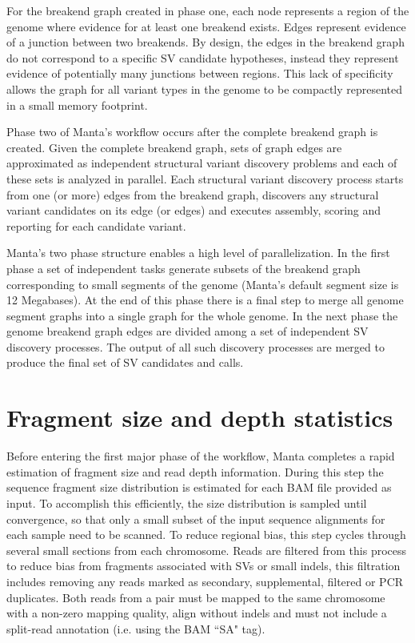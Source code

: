 \documentclass{article}
\begin{document}
For the breakend graph created in phase one, each node represents a region of the genome where evidence for at least one breakend exists. Edges represent evidence of a junction between two breakends. By design, the edges in the breakend graph do not correspond to a specific SV candidate hypotheses, instead they represent evidence of potentially many junctions between regions. This lack of specificity allows the graph for all variant types in the genome to be compactly represented in a small memory footprint.

Phase two of Manta's workflow occurs after the complete breakend graph is created. Given the complete breakend graph, sets of graph edges are approximated as independent structural variant discovery problems and each of these sets is analyzed in parallel. Each structural variant discovery process starts from one (or more) edges from the breakend graph, discovers any structural variant candidates on its edge (or edges) and executes assembly, scoring and reporting for each candidate variant.

Manta's two phase structure enables a high level of parallelization. In the first phase a set of independent tasks generate subsets of the breakend graph corresponding to small segments of the genome (Manta's default segment size is 12 Megabases). At the end of this phase there is a final step to merge all genome segment graphs into a single graph for the whole genome. In the next phase the genome breakend graph edges are divided among a set of independent SV discovery processes. The output of all such discovery processes are merged to produce the final set of SV candidates and calls.

\section{Fragment size and depth statistics}

Before entering the first major phase of the workflow, Manta completes a rapid estimation of fragment size and read depth information. During this step the sequence fragment size distribution is estimated for each BAM file provided as input. To accomplish this efficiently, the size distribution is sampled until convergence, so that only a small subset of the input sequence alignments for each sample need to be scanned. To reduce regional bias, this step cycles through several small sections from each chromosome. Reads are filtered from this process to reduce bias from fragments associated with SVs or small indels, this filtration includes removing any reads marked as secondary, supplemental, filtered or PCR duplicates. Both reads from a pair must be mapped to the same chromosome with a non-zero mapping quality, align without indels and must not include a split-read annotation (i.e. using the BAM ``SA" tag).
\end{document}
